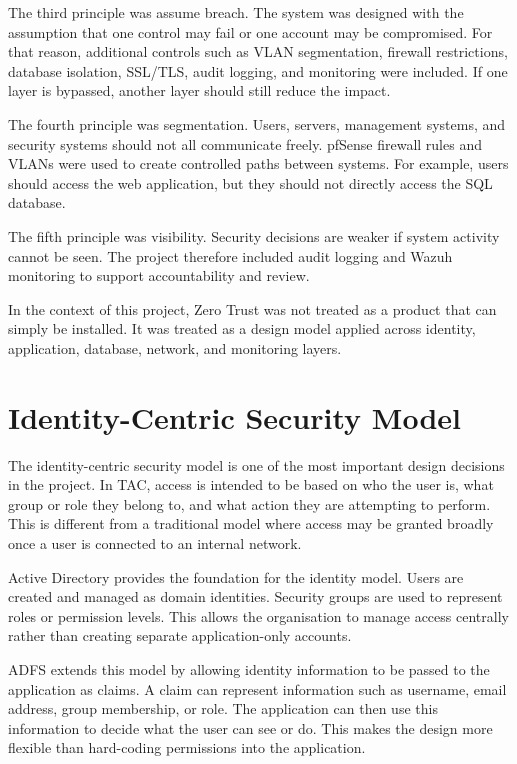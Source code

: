 The third principle was assume breach. The system was designed with the assumption that one control may fail or one account may be compromised. For that reason, additional controls such as VLAN segmentation, firewall restrictions, database isolation, SSL/TLS, audit logging, and monitoring were included. If one layer is bypassed, another layer should still reduce the impact.

The fourth principle was segmentation. Users, servers, management systems, and security systems should not all communicate freely. pfSense firewall rules and VLANs were used to create controlled paths between systems. For example, users should access the web application, but they should not directly access the SQL database.

The fifth principle was visibility. Security decisions are weaker if system activity cannot be seen. The project therefore included audit logging and Wazuh monitoring to support accountability and review.

In the context of this project, Zero Trust was not treated as a product that can simply be installed. It was treated as a design model applied across identity, application, database, network, and monitoring layers.


\section{Identity-Centric Security Model}

The identity-centric security model is one of the most important design decisions in the project. In TAC, access is intended to be based on who the user is, what group or role they belong to, and what action they are attempting to perform. This is different from a traditional model where access may be granted broadly once a user is connected to an internal network.

Active Directory provides the foundation for the identity model. Users are created and managed as domain identities. Security groups are used to represent roles or permission levels. This allows the organisation to manage access centrally rather than creating separate application-only accounts.

ADFS extends this model by allowing identity information to be passed to the application as claims. A claim can represent information such as username, email address, group membership, or role. The application can then use this information to decide what the user can see or do. This makes the design more flexible than hard-coding permissions into the application.

